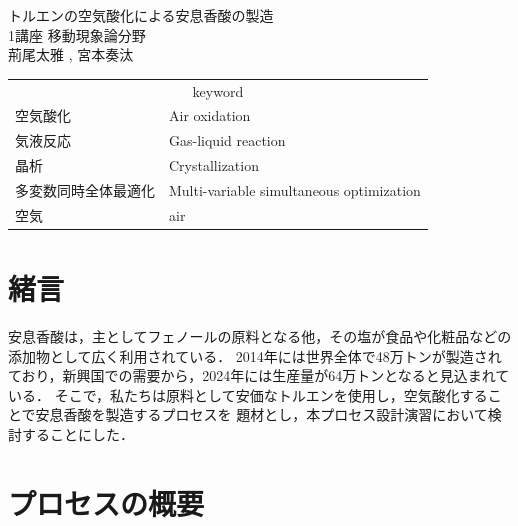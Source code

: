 \documentclass[a4j]{jsreport}
\begin{document}
\begin{titlepage}
\vspace{5cm}
\centering
{\Huge トルエンの空気酸化による安息香酸の製造} \\
\vspace{2cm}
\centering
{\Large 1講座 移動現象論分野} \\
\vspace{0.5cm}
\centering
{\large 荊尾太雅 , 宮本奏汰} \\
\vspace{3cm}
\begin{table}[htbp]
    \begin{center}
        \begin{tabular}[htbp]{ll}
            \multicolumn{2}{c}{{\LARGE keyword}} \\
            {\Large 空気酸化}&{\Large Air oxidation} \\
            {\Large 気液反応}&{\Large Gas-liquid reaction} \\
            {\Large 晶析}&{\Large Crystallization} \\
            {\Large 多変数同時全体最適化}&{\Large Multi-variable simultaneous optimization} \\
            {\Large 空気}&{\Large air} \\
        \end{tabular}
    \end{center}
\end{table}
\end{titlepage}


\setcounter{tocdepth}{2}
\tableofcontents


\newpage

\chapter{緒言}
安息香酸は，主としてフェノールの原料となる他，その塩が食品や化粧品などの添加物として広く利用されている．
2014年には世界全体で48万トンが製造されており，新興国での需要から，2024年には生産量が64万トンとなると見込まれている．
そこで，私たちは原料として安価なトルエンを使用し，空気酸化することで安息香酸を製造するプロセスを
題材とし，本プロセス設計演習において検討することにした．

\newpage
\chapter{プロセスの概要}
\end{document}
